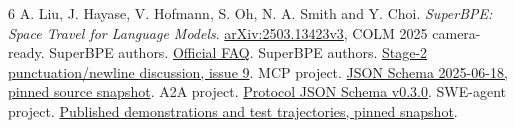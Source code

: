 \documentclass[10pt,a4paper]{article}
\begin{document}
\vspace{-3pt}
\begin{thebibliography}{6}
\footnotesize\setlength{\itemsep}{0pt}\setlength{\parskip}{0pt}
 A. Liu, J. Hayase, V. Hofmann, S. Oh, N. A. Smith and Y. Choi.
\emph{SuperBPE: Space Travel for Language Models}.
\href{https://arxiv.org/abs/2503.13423v3}{arXiv:2503.13423v3}, COLM 2025 camera-ready.
 SuperBPE authors. \href{https://superbpe.github.io/faq.html}{Official FAQ}.
 SuperBPE authors.
\href{https://github.com/PythonNut/superbpe/issues/9}{Stage-2 punctuation/newline discussion, issue 9}.
 MCP project.
\href{https://github.com/modelcontextprotocol/modelcontextprotocol/blob/3778656b2e0ba6725035e816fe3085374cbaa736/schema/2025-06-18/schema.json}{JSON Schema 2025-06-18, pinned source snapshot}.
 A2A project.
\href{https://github.com/a2aproject/A2A/blob/8d57eba286de756176892518a8fc39b0ac2ccefb/specification/json/a2a.json}{Protocol JSON Schema v0.3.0}.
 SWE-agent project.
\href{https://github.com/SWE-agent/SWE-agent/tree/3ea751c087f32b16e039a2233dd6eefecef325d5}{Published demonstrations and test trajectories, pinned snapshot}.
\end{thebibliography}
\end{document}

